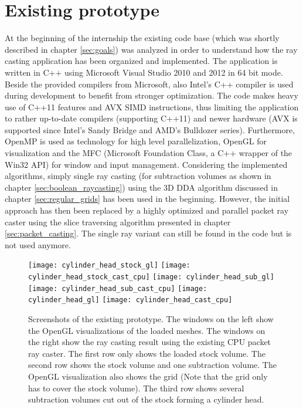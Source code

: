 \section{Existing prototype}
\label{sec:existing_prototype}

At the beginning of the internship the existing code base (which was shortly described in chapter \ref{sec:goals}) was analyzed in order to understand how the ray casting application has been organized and implemented. The application is written in C++ using Microsoft Visual Studio 2010 and 2012 in 64 bit mode. Beside the provided compilers from Microsoft, also Intel's C++ compiler is used during development to benefit from stronger optimization. The code makes heavy use of C++11 features and AVX SIMD instructions, thus limiting the application to rather up-to-date compilers (supporting C++11) and newer hardware (AVX is supported since Intel's Sandy Bridge and AMD's Bulldozer series). Furthermore, OpenMP is used as technology for high level parallelization, OpenGL for visualization and the MFC (Microsoft Foundation Class, a C++ wrapper of the Win32 API) for window and input management.
Considering the implemented algorithms, simply single ray casting (for subtraction volumes as shown in chapter \ref{sec:boolean_raycasting}) using the 3D DDA algorithm discussed in chapter \ref{sec:regular_grids} has been used in the beginning. However, the initial approach has then been replaced by a highly optimized and parallel packet ray caster using the slice traversing algorithm presented in chapter \ref{sec:packet_casting}. The single ray variant can still be found in the code but is not used anymore.

\begin{figure}
\centering
\texttt{[image: cylinder\_head\_stock\_gl]}
\texttt{[image: cylinder\_head\_stock\_cast\_cpu]}
\texttt{[image: cylinder\_head\_sub\_gl]}
\texttt{[image: cylinder\_head\_sub\_cast\_cpu]}
\texttt{[image: cylinder\_head\_gl]}
\texttt{[image: cylinder\_head\_cast\_cpu]}
\caption{Screenshots of the existing prototype. The windows on the left show the OpenGL visualizations of the loaded meshes. The windows on the right show the ray casting result using the existing CPU packet ray caster. The first row only shows the loaded stock volume. The second row shows the stock volume and one subtraction volume. The OpenGL visualization also shows the grid (Note that the grid only has to cover the stock volume). The third row shows several subtraction volumes cut out of the stock forming a cylinder head.}
\label{fig:cylinder_head}
\end{figure}

